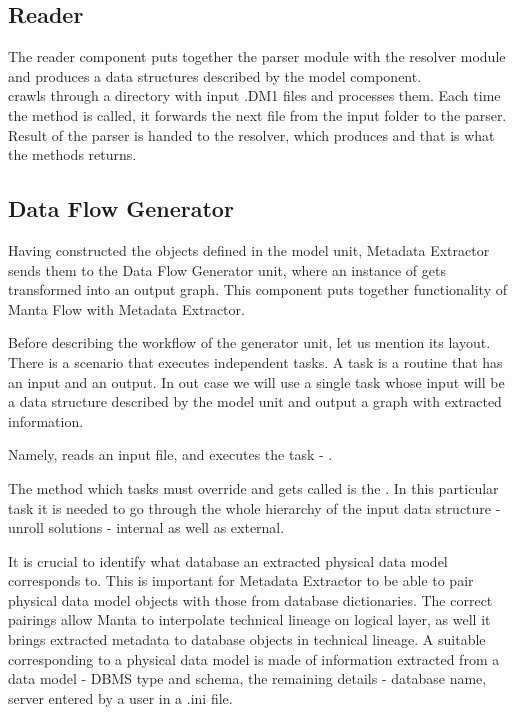 \subsection{Reader}

The reader component puts together the parser module with the resolver module and produces a data structures described by the model component. \\

 crawls through a directory with input .DM1 files and processes them. 
Each time the  method is called, it forwards the next file from the input folder to the parser. Result of the parser is handed to the resolver, which produces  and that is what the  methods returns.

\subsection{Data Flow Generator}

Having constructed the objects defined in the model unit, Metadata Extractor sends them to the Data Flow Generator unit, where an instance of  gets transformed into an output graph. This component puts together functionality of Manta Flow with Metadata Extractor.

Before describing the workflow of the generator unit, let us mention its layout.
There is a scenario that executes independent tasks. A task is a routine that has an input and an output. In out case we will use a single task whose input will be a data structure described by the model unit and output a graph with extracted information.

 Namely,  reads an input file, and executes the task - . 
 
 The method which tasks must override and gets called is the . In this particular task it is needed to go through the whole hierarchy of the input data structure -  unroll solutions - internal as well as external.

It is crucial to identify what database an extracted physical data model corresponds to.
This is important for Metadata Extractor to be able to pair physical data model objects with those from database dictionaries. The correct pairings allow Manta to interpolate technical lineage on logical layer, as well it brings extracted metadata to database objects in technical lineage.
A suitable  corresponding to a physical data model is made of information extracted from a data model - DBMS type and schema, the remaining details - database name, server entered by a user in a .ini file.

